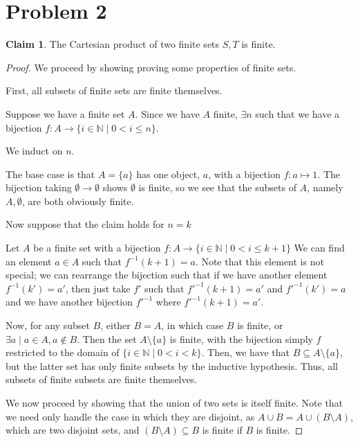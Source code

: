 \documentclass[12pt,letterpaper]{article}
\theoremstyle{definition}
\newtheorem*{claim}{Claim}
\newcommand{\N}{\mathbb{N}}
\begin{document}
\section*{Problem 2}
\begin{claim}
    The Cartesian product of two finite sets $S,T$ is finite.
\end{claim}

\begin{proof}
    We proceed by showing proving some properties of finite sets.

    First, all subsets of finite sets are finite themselves.
    
    Suppose we have a finite set $A$.
    Since we have $A$ finite, $\exists n$ such that we have a bijection 
    $f: A \rightarrow \{i \in \N \mid 0 < i \leq n\}$.
    
    We induct on $n$.

    The base case is that $A = \{a\}$ has one object, $a$, with a bijection $f: a \mapsto 1$. 
    The bijection taking $\emptyset \rightarrow \emptyset$ shows $\emptyset$ is finite, so
    we see that the subsets of $A$, namely $A, \emptyset$, are both obviously finite.

    Now suppose that the claim holds for $n = k$

    Let $A$ be a finite set with a bijection $f: A \rightarrow \{i \in \N \mid 0 < i \leq k+1\}$
    We can find an element $a \in A$ such that $f^{-1}(k+1) = a$.
    Note that this element is not special; we can rearrange the bijection such that
    if we have another element $f^{-1}(k') = a'$, then just take $f'$ such that $f'^{-1}(k+1) = a'$
    and $f'^{-1}(k') = a$ and we have another bijection $f'^{-1}$ where $f'^{-1}(k+1) = a'$.

    Now, for any subset $B$, either $B = A$, in which case $B$ is finite, or $\exists a \mid a \in A, a \notin B$. Then
    the set $A \setminus \{a\}$ is finite, with the bijection simply $f$ restricted to
    the domain of $\{i \in \N \mid 0 < i < k\}$. 
    Then, we have that $B \subseteq A \setminus \{a\}$, but the latter set has only finite
    subsets by the inductive hypothesis.
    Thus, all subsets of finite subsets are finite themselves.

    We now proceed by showing that the union of two sets is itself finite.
    Note that we need only handle the case in which they are disjoint, as $A \cup B = A \cup (B \setminus A)$,
    which are two disjoint sets, and $(B \setminus A) \subseteq B$ is finite if $B$ is finite.


\end{proof}
\end{document}
